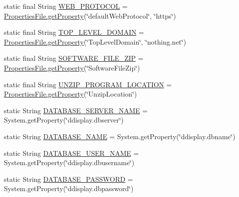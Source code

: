 \begin{DoxyCompactItemize}
\item 
static final String \hyperlink{classgov_1_1fnal_1_1ppd_1_1dd_1_1GlobalVariables_aa3bf05d555f0c3489c60664ae54a2480}{W\-E\-B\-\_\-\-P\-R\-O\-T\-O\-C\-O\-L} = \hyperlink{classgov_1_1fnal_1_1ppd_1_1dd_1_1util_1_1nonguiUtils_1_1PropertiesFile_ad3e5ac77723df18cb845643e3e219f49}{Properties\-File.\-get\-Property}(\char`\"{}default\-Web\-Protocol\char`\"{}, \char`\"{}https\char`\"{})
\item 
static final String \hyperlink{classgov_1_1fnal_1_1ppd_1_1dd_1_1GlobalVariables_ad0a782cf8410f087e2bacb776ff69ca1}{T\-O\-P\-\_\-\-L\-E\-V\-E\-L\-\_\-\-D\-O\-M\-A\-I\-N} = \hyperlink{classgov_1_1fnal_1_1ppd_1_1dd_1_1util_1_1nonguiUtils_1_1PropertiesFile_ad3e5ac77723df18cb845643e3e219f49}{Properties\-File.\-get\-Property}(\char`\"{}Top\-Level\-Domain\char`\"{}, \char`\"{}nothing.\-net\char`\"{})
\item 
static final String \hyperlink{classgov_1_1fnal_1_1ppd_1_1dd_1_1GlobalVariables_ab8e56e6480b2c30248d2e20aee782cb4}{S\-O\-F\-T\-W\-A\-R\-E\-\_\-\-F\-I\-L\-E\-\_\-\-Z\-I\-P} = \hyperlink{classgov_1_1fnal_1_1ppd_1_1dd_1_1util_1_1nonguiUtils_1_1PropertiesFile_ad3e5ac77723df18cb845643e3e219f49}{Properties\-File.\-get\-Property}(\char`\"{}Software\-File\-Zip\char`\"{})
\item 
static final String \hyperlink{classgov_1_1fnal_1_1ppd_1_1dd_1_1GlobalVariables_a3b3484a9eaa4099af2a1ade1fa0f94a5}{U\-N\-Z\-I\-P\-\_\-\-P\-R\-O\-G\-R\-A\-M\-\_\-\-L\-O\-C\-A\-T\-I\-O\-N} = \hyperlink{classgov_1_1fnal_1_1ppd_1_1dd_1_1util_1_1nonguiUtils_1_1PropertiesFile_ad3e5ac77723df18cb845643e3e219f49}{Properties\-File.\-get\-Property}(\char`\"{}Unzip\-Location\char`\"{})
\item 
static String \hyperlink{classgov_1_1fnal_1_1ppd_1_1dd_1_1GlobalVariables_a84bb07dcee9c961579282f50a5031c0e}{D\-A\-T\-A\-B\-A\-S\-E\-\_\-\-S\-E\-R\-V\-E\-R\-\_\-\-N\-A\-M\-E} = System.\-get\-Property(\char`\"{}ddisplay.\-dbserver\char`\"{})
\item 
static String \hyperlink{classgov_1_1fnal_1_1ppd_1_1dd_1_1GlobalVariables_a737045676a15c469e5cb486d80c08043}{D\-A\-T\-A\-B\-A\-S\-E\-\_\-\-N\-A\-M\-E} = System.\-get\-Property(\char`\"{}ddisplay.\-dbname\char`\"{})
\item 
static String \hyperlink{classgov_1_1fnal_1_1ppd_1_1dd_1_1GlobalVariables_a1b5c1519d1964bf42b3fe4908ae6d444}{D\-A\-T\-A\-B\-A\-S\-E\-\_\-\-U\-S\-E\-R\-\_\-\-N\-A\-M\-E} = System.\-get\-Property(\char`\"{}ddisplay.\-dbusername\char`\"{})
\item 
static String \hyperlink{classgov_1_1fnal_1_1ppd_1_1dd_1_1GlobalVariables_ae63bd973c9c02683b0c4964179ceefe0}{D\-A\-T\-A\-B\-A\-S\-E\-\_\-\-P\-A\-S\-S\-W\-O\-R\-D} = System.\-get\-Property(\char`\"{}ddisplay.\-dbpassword\char`\"{})

\end{DoxyCompactItemize}
